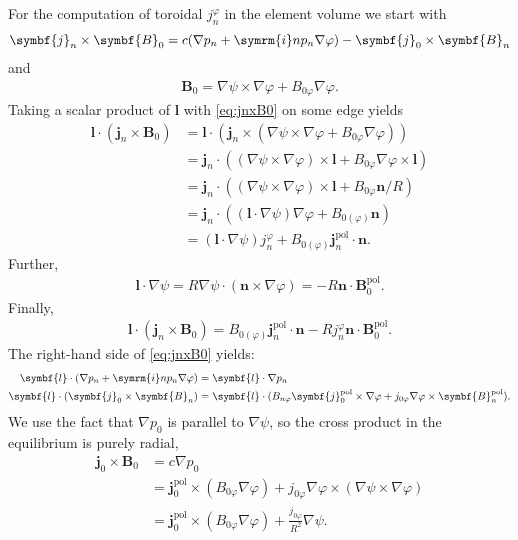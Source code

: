\documentclass[a4paper, 10pt, english]{article}
\let\temp\vartheta
\let\vartheta\theta
\let\theta\temp
\let\temp\varphi
\let\varphi\phi
\let\phi\temp
\let\vec\symbf
\newcommand*\im{\ensuremath{\symrm{i}}}
\newcommand*\pol{\ensuremath{\textrm{pol}}}
\begin{document}
For the computation of toroidal $j_{n}^{\phi}$ in the element volume we start with
\begin{gather}
  \vec{j}_{n} \times \vec{B}_{0} = c (\nabla p_{n} + \im n p_{n} \nabla \phi) - \vec{j}_{0} \times \vec{B}_{n} \label{eq:jnxB0}
\end{gather}
and
\begin{gather}
  \vec{B}_{0} = \nabla \psi \times \nabla \phi + B_{0 \phi} \nabla \phi.
\end{gather}
Taking a scalar product of $\vec{l}$ with \cref{eq:jnxB0} on some edge yields
\begin{align}
  \vec{l} \cdot (\vec{j}_{n} \times \vec{B}_{0}) &= \vec{l} \cdot (\vec{j}_{n} \times (\nabla \psi \times \nabla \phi + B_{0 \phi} \nabla \phi)) \nonumber \\
  &= \vec{j}_{n} \cdot ((\nabla \psi \times \nabla \phi) \times \vec{l} + B_{0 \phi} \nabla \phi \times \vec{l}) \nonumber \\
  &= \vec{j}_{n} \cdot ((\nabla \psi \times \nabla \phi) \times \vec{l} + B_{0 \phi} \vec{n} / R) \nonumber \\
  &= \vec{j}_{n} \cdot \left( (\vec{l} \cdot \nabla \psi) \nabla \phi + B_{0 (\phi)} \vec{n} \right) \nonumber \\
  &= (\vec{l} \cdot \nabla \psi) j_{n}^{\phi} + B_{0 (\phi)} \vec{j}_{n}^{\pol} \cdot \vec{n}.
\end{align}
Further,
\begin{gather}
  \vec{l} \cdot \nabla \psi = R \nabla \psi \cdot \left( \vec{n} \times \nabla \phi \right) = -R \vec{n} \cdot \vec{B}_{0}^{\pol}.
\end{gather}
Finally,
\begin{gather}
  \vec{l} \cdot (\vec{j}_{n} \times \vec{B}_{0}) = B_{0 (\phi)} \vec{j}_{n}^{\pol} \cdot \vec{n} - R j_{n}^{\phi} \vec{n} \cdot \vec{B}_{0}^{\pol}.
\end{gather}
The right-hand side of \cref{eq:jnxB0} yields:
\begin{align}
  \vec{l} \cdot (\nabla p_{n} + \im n p_{n} \nabla \phi) &= \vec{l} \cdot \nabla p_{n} \\
  \vec{l} \cdot (\vec{j}_{0} \times \vec{B}_{n}) &= \vec{l} \cdot (B_{n \phi} \vec{j}_{0}^{\pol} \times \nabla \phi + j_{0 \phi} \nabla \phi \times \vec{B}_{n}^{\pol}).
\end{align}
We use the fact that $\nabla p_{0}$ is parallel to $\nabla \psi$, so the cross product in the equilibrium is purely radial,
\begin{align}
  \vec{j}_{0} \times \vec{B}_{0} &= c \nabla p_{0} \nonumber \\
  &= \vec{j}_{0}^{\pol} \times (B_{0 \phi} \nabla \phi) + j_{0 \phi} \nabla \phi \times (\nabla \psi \times \nabla \phi) \nonumber \\
  &= \vec{j}_{0}^{\pol} \times (B_{0 \phi} \nabla \phi) + \frac{j_{0 \phi}}{R^{2}} \nabla \psi.
\end{align}
\end{document}
